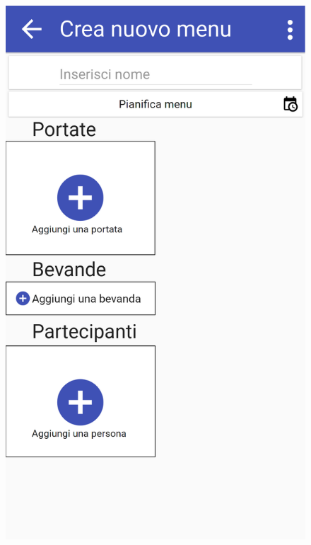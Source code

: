 \begin{figure}[H]
	\begin{minipage}{.49\textwidth}
		\includegraphics[width=\textwidth]{img/wireframe/crea_nuovo_menu.png}
	\end{minipage}
	\begin{minipage}{.49\textwidth}

\end{minipage}
\end{figure}
